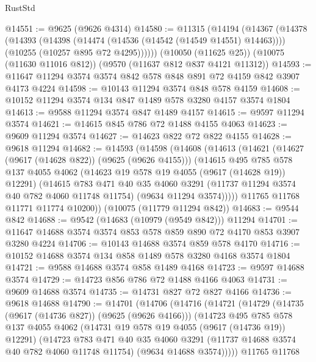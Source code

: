 \begin{lexlean}{RustStd}
\begin{coremodule}
@14551 := @9625 (@9626 @4314)
@14580 := @11315
    (@14194
      (@14367
        (@14378
          (@14393
            (@14398 (@14474 (@14536 (@14542 (@14549 @14551) @14463))))
            (@10255 (@10257 @895 @72 @4295))))))
    (@10050 (@11625 @25))
    (@10075 (@11630 @11016 @812))
    (@9570 (@11637 @812 @837 @4121 @11312))
@14593 := @11647 @11294 @3574 @3574 @842 @578 @848 @891 @72 @4159 @842 @3907 @4173 @4224
@14598 := @10143 @11294 @3574 @848 @578 @4159
@14608 := @10152 @11294 @3574 @134 @847 @1489 @578 @3280 @4157 @3574 @1804
@14613 := @9588 @11294 @3574 @847 @1489 @4157
@14615 := @9597 @11294 @3574
@14621 := @14615 @845 @786 @72 @1488 @4155 @4063
@14623 := @9609 @11294 @3574
@14627 := @14623 @822 @72 @822 @4155
@14628 := @9618 @11294
@14682 := @14593
    (@14598
      (@14608
        (@14613
          (@14621
            (@14627 (@9617 (@14628 @822)) (@9625 (@9626 @4155)))
            (@14615
              @495
              @785
              @578
              @137
              @4055
              @4062
              (@14623 @19 @578 @19 @4055 (@9617 (@14628 @19)) @12291)
              (@14615
                @783
                @471
                @40
                @35
                @4060
                @3291
                (@11737 @11294 @3574 @40 @782 @4060 @11748 @11754)
                (@9634 @11294 @3574)))))
        @11765
        @11768
        @11771
        @11774
        @10200))
    (@10075 (@11779 @11294 @842))
@14683 := @9544 @842
@14688 := @9542 (@14683 (@10979 (@9549 @842))) @11294
@14701 := @11647 @14688 @3574 @3574 @853 @578 @859 @890 @72 @4170 @853 @3907 @3280 @4224
@14706 := @10143 @14688 @3574 @859 @578 @4170
@14716 := @10152 @14688 @3574 @134 @858 @1489 @578 @3280 @4168 @3574 @1804
@14721 := @9588 @14688 @3574 @858 @1489 @4168
@14723 := @9597 @14688 @3574
@14729 := @14723 @856 @786 @72 @1488 @4166 @4063
@14731 := @9609 @14688 @3574
@14735 := @14731 @827 @72 @827 @4166
@14736 := @9618 @14688
@14790 := @14701
    (@14706
      (@14716
        (@14721
          (@14729
            (@14735 (@9617 (@14736 @827)) (@9625 (@9626 @4166)))
            (@14723
              @495
              @785
              @578
              @137
              @4055
              @4062
              (@14731 @19 @578 @19 @4055 (@9617 (@14736 @19)) @12291)
              (@14723
                @783
                @471
                @40
                @35
                @4060
                @3291
                (@11737 @14688 @3574 @40 @782 @4060 @11748 @11754)
                (@9634 @14688 @3574)))))
        @11765
        @11768

\end{coremodule}
\end{lexlean}
